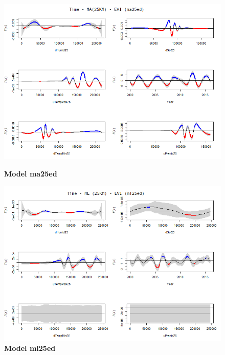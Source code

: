 \begin{figure}[H]
 \centering
    \begin{minipage}{0.8\textwidth}
        \centering
        \includegraphics[width=1.2\textwidth]{ma25ed.png} %
        \caption{\textbf{Model ma25ed}}
    \end{minipage}\hfill
    \begin{minipage}{0.8\textwidth}
        \centering
        \includegraphics[width=1.2\textwidth]{ml25ed.png} %
        \caption{\textbf{Model ml25ed}}
    \end{minipage}
\end{figure}

